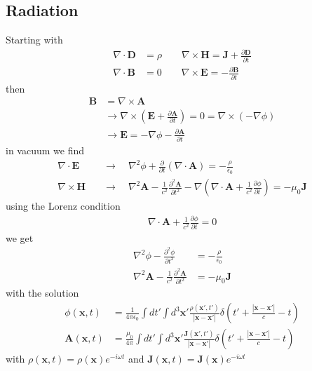 \documentclass[../main.tex]{subfiles}
\begin{document}
\subsection{Radiation}
Starting with
\begin{align}
\nabla\cdot\mathbf{D}&=\rho\qquad\nabla\times\mathbf{H}=\mathbf{J}+\frac{\partial\mathbf{D}}{\partial t}\\
\nabla\cdot\mathbf{B}&=0\qquad\nabla\times\mathbf{E}=-\frac{\partial\mathbf{B}}{\partial t}
\end{align}
then
\begin{align}
\mathbf{B}&=\nabla\times\mathbf{A}\\
&\rightarrow\nabla\times\left(\mathbf{E}+\frac{\partial\mathbf{A}}{\partial t}\right)=0=\nabla\times(-\nabla\phi)\\
&\rightarrow\mathbf{E}=-\nabla\phi-\frac{\partial\mathbf{A}}{\partial t}
\end{align}
in vacuum we find
\begin{align}
\nabla\cdot\mathbf{E}\quad&\rightarrow\quad\nabla^2\phi+\frac{\partial}{\partial t}(\nabla\cdot\mathbf{A})=-\frac{\rho}{\epsilon_0}\\
\nabla\times\mathbf{H}\quad&\rightarrow\quad\nabla^2\mathbf{A}-\frac{1}{c^2}\frac{\partial^2\mathbf{A}}{\partial t^2}-\nabla\left(\nabla\cdot\mathbf{A}+\frac{1}{c^2}\frac{\partial\phi}{\partial t}\right)=-\mu_0\mathbf{J}
\end{align}
using the Lorenz condition
\begin{align}
\nabla\cdot\mathbf{A}+\frac{1}{c^2}\frac{\partial\phi}{\partial t}=0
\end{align}
we get
\begin{align}
\nabla^2\phi-\frac{\partial^2\phi}{\partial t^2}&=-\frac{\rho}{\epsilon_0}\\
\nabla^2\mathbf{A}-\frac{1}{c^2}\frac{\partial^2\mathbf{A}}{\partial t^2}&=-\mu_0\mathbf{J}
\end{align}
with the solution
\begin{align}
\phi(\mathbf{x},t)&=\frac{1}{4\pi\epsilon_0}\int dt'\int d^3\mathbf{x}'\frac{\rho(\mathbf{x}',t')}{|\mathbf{x}-\mathbf{x}'|}\delta\left(t'+\frac{|\mathbf{x}-\mathbf{x}'|}{c}-t\right)\\
\mathbf{A}(\mathbf{x},t)&=\frac{\mu_0}{4\pi}\int dt'\int d^3\mathbf{x}'\frac{\mathbf{J}(\mathbf{x}',t')}{|\mathbf{x}-\mathbf{x}'|}\delta\left(t'+\frac{|\mathbf{x}-\mathbf{x}'|}{c}-t\right)
\end{align}
with $\rho(\mathbf{x},t)=\rho(\mathbf{x})e^{-i\omega t}$ and $\mathbf{J}(\mathbf{x},t)=\mathbf{J}(\mathbf{x})e^{-i\omega t}$
\end{document}
